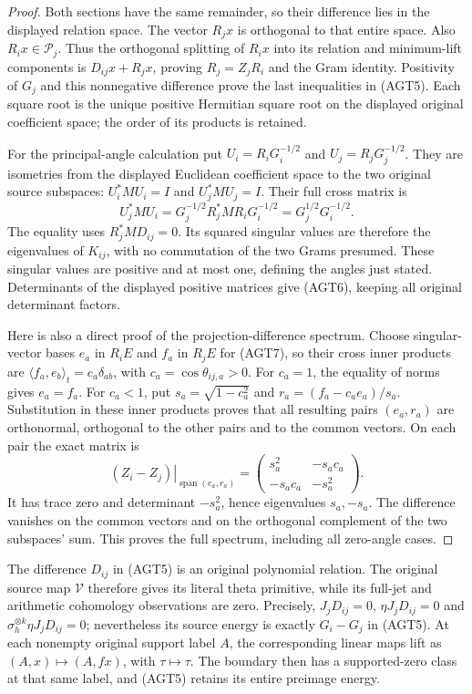 \documentclass[11pt]{article}
\newcommand{\cP}{\mathcal P}
\begin{document}
\begin{proof}
Both sections have the same remainder, so their difference lies
in the displayed relation space. The vector $R_jx$ is orthogonal
to that entire space. Also $R_ix\in\cP_j$. Thus the orthogonal
splitting of $R_ix$ into its relation and minimum-lift components
is $D_{ij}x+R_jx$, proving $R_j=Z_jR_i$ and the Gram identity.
Positivity of $G_j$ and this nonnegative difference prove the
last inequalities in (AGT5). Each square root is the unique
positive Hermitian square root on the displayed original
coefficient space; the order of its products is retained.

For the principal-angle calculation put
$U_i=R_iG_i^{-1/2}$ and $U_j=R_jG_j^{-1/2}$.
They are isometries from the displayed Euclidean coefficient
space to the two original source subspaces: $U_i^*MU_i=I$
and $U_j^*MU_j=I$. Their full cross matrix is
\[
 U_j^*MU_i=G_j^{-1/2}R_j^*MR_iG_i^{-1/2}
          =G_j^{1/2}G_i^{-1/2}.
 \tag{AGT7}
\]
The equality uses $R_j^*MD_{ij}=0$. Its squared singular values
are therefore the eigenvalues of $K_{ij}$, with no commutation
of the two Grams presumed. These singular values are positive
and at most one, defining the angles just stated. Determinants
of the displayed positive matrices give (AGT6), keeping all
original determinant factors.

Here is also a direct proof of the projection-difference spectrum.
Choose singular-vector bases $e_a$ in $R_iE$ and $f_a$ in $R_jE$
for (AGT7), so their cross inner products are
$\langle f_a,e_b\rangle_t=c_a\delta_{ab}$, with
$c_a=\cos\theta_{ij,a}>0$. For $c_a=1$, the equality of norms
gives $e_a=f_a$. For $c_a<1$, put
$s_a=\sqrt{1-c_a^2}$ and $r_a=(f_a-c_ae_a)/s_a$.
Substitution in these inner products proves that all resulting
pairs $(e_a,r_a)$ are orthonormal, orthogonal to the other pairs
and to the common vectors. On each pair the exact matrix is
\[
 \left.(Z_i-Z_j)\right|_{\operatorname{span}(e_a,r_a)}
 =\begin{pmatrix}s_a^2&-s_ac_a\\-s_ac_a&-s_a^2\end{pmatrix}.
 \tag{AGT8}
\]
It has trace zero and determinant $-s_a^2$, hence eigenvalues
$s_a,-s_a$. The difference vanishes on the common vectors
and on the orthogonal complement of the two subspaces' sum.
This proves the full spectrum, including all zero-angle cases.
\end{proof}

The difference $D_{ij}$ in (AGT5) is an original polynomial
relation. The original source map $\mathcal V$ therefore gives
its literal theta primitive, while its full-jet and arithmetic
cohomology observations are zero. Precisely,
$J_jD_{ij}=0$, $\eta J_jD_{ij}=0$ and
$\sigma_h^{\otimes k}\eta J_jD_{ij}=0$; nevertheless its
source energy is exactly $G_i-G_j$ in (AGT5).
At each nonempty original support label $A$, the corresponding
linear maps lift as $(A,x)\mapsto(A,fx)$, with $\tau\mapsto\tau$.
The boundary then has a supported-zero class at that same
label, and (AGT5) retains its entire preimage energy.
\end{document}
